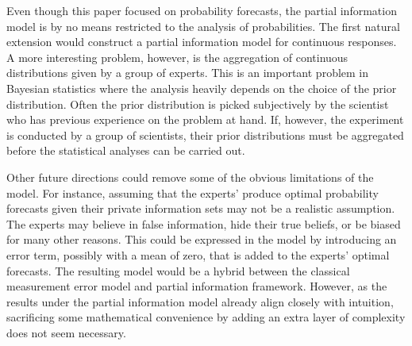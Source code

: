 \documentclass[11pt,twoside]{article}
\theoremstyle{definition}
\theoremstyle{definition}
\begin{document}
Even though this paper focused on probability forecasts, the partial information model is by no means restricted to the analysis of probabilities. The first natural extension would construct a partial information model for continuous responses. A more interesting problem, however, is the aggregation of  continuous distributions given by a group of experts. This is an important problem in Bayesian statistics where the analysis heavily depends on the choice of the prior distribution. Often the prior distribution is picked subjectively by the scientist who has previous experience on the problem at hand. If, however, the experiment is conducted by a group of scientists, their prior distributions must be aggregated before the statistical analyses can be carried out. 
 
 Other future directions could  remove some of the obvious limitations of the model. For instance, assuming that the experts' produce optimal probability forecasts given their private information sets may not be a realistic assumption. The experts may believe in false information, hide their true beliefs, or be biased for many other reasons. This could be expressed in the model by introducing an error term, possibly with a mean of zero, that is added to the experts' optimal forecasts. The resulting model would be a hybrid between the classical measurement error model and partial information framework. However, as the results under the partial information model already align closely with intuition, sacrificing some mathematical convenience by adding an extra layer of complexity does not seem necessary. 



%

\end{document}
